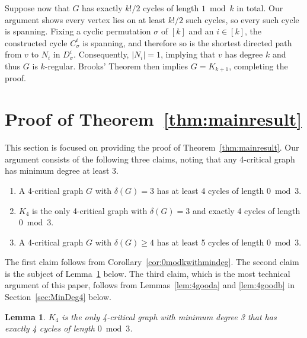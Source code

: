 \documentclass[12pt]{article}
\numberwithin{theorem}{section}
\newtheorem{lem}[theorem]{Lemma}
\begin{document}
Suppose now that $G$ has exactly $k!/2$ cycles of length $1 \bmod k$ in total. Our argument shows every vertex lies on at least $k!/2$ such cycles, so every such cycle is spanning. Fixing a cyclic permutation $\sigma$ of $[k]$ and an $i \in [k]$, the constructed cycle $C^i_{\sigma}$ is spanning, and therefore so is the shortest directed path from $v$ to $N_i$ in $D_{\sigma}^i$. Consequently, $|N_i|=1$, implying that $v$ has degree $k$ and thus $G$ is $k$-regular.  Brooks' Theorem then implies $G=K_{k+1}$, completing the proof. \\

\section{Proof of Theorem~\ref{thm:mainresult}}
\label{sec:thm1proof}

This section is focused on providing the proof of Theorem~\ref{thm:mainresult}.  Our argument consists of the following three claims, noting that any 4-critical graph has minimum degree at least 3.
\begin{enumerate}
    \item A 4-critical graph $G$ with $\delta(G) =3$ has at least 4 cycles of length $0\bmod 3$.
    \item $K_4$ is the only 4-critical graph with $\delta(G)=3$ and exactly 4 cycles of length $0\bmod 3$.
    \item A 4-critical graph $G$ with $\delta(G)\ge 4$ has at least 5 cycles of length $0\bmod 3$.
\end{enumerate}

The first claim follows from Corollary~\ref{cor:0modkwithmindeg}. The second claim is the subject of Lemma~\ref{lem:kay4}  below.  The third claim, which is the most technical argument of this paper, follows from Lemmas~\ref{lem:4gooda} and \ref{lem:4goodb} in Section~\ref{sec:MinDeg4} below.

\begin{lem}
\label{lem:kay4}
    $K_4$ is the only 4-critical graph with minimum degree 3 that has exactly 4 cycles of length $0 \bmod 3$.
\end{lem}
\end{document}

